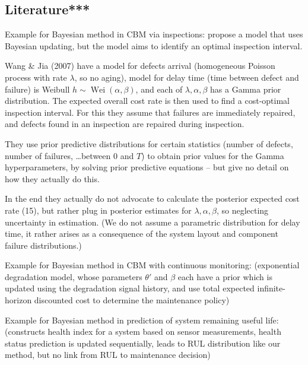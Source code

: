 \documentclass[authoryear]{elsarticle}
\newcommand{\wei}{\operatorname{Wei}} %
\begin{document}
\subsection{Literature***}

Example for Bayesian method in CBM via inspections: \cite{2007:wang-jia}
propose a model that uses Bayesian updating,
but the model aims to identify an optimal inspection interval.

\begin{scriptsize}
Wang \& Jia (2007) have a model for defects arrival (homogeneous Poisson process with rate $\lambda$, so no aging),
model for delay time (time between defect and failure) is Weibull $h \sim \wei(\alpha,\beta)$,
and each of $\lambda, \alpha, \beta$ has a Gamma prior distribution.
The expected overall cost rate is then used to find a cost-optimal inspection interval.
For this they assume that failures are immediately repaired,
and defects found in an inspection are repaired during inspection.

They use prior predictive distributions for certain statistics (number of defects, number of failures, \ldots between $0$ and $T$)
to obtain prior values for the Gamma hyperparameters,
by solving prior predictive equations -- but give no detail on how they actually do this.

In the end they actually do not advocate to calculate the posterior expected cost rate (15),
but rather plug in posterior estimates for $\lambda, \alpha, \beta$,
so neglecting uncertainty in estimation.
(We do not assume a parametric distribution for delay time,
it rather arises as a consequence of the system layout and component failure distributions.)

\end{scriptsize}

Example for Bayesian method in CBM with continuous monitoring: \cite{2011:elwany-et-al}
(exponential degradation model, whose parameters $\theta'$ and $\beta$ each have a prior
which is updated using the degradation signal history,
and use total expected infinite-horizon discounted cost to determine the maintenance policy)

Example for Bayesian method in prediction of system remaining useful life: \cite{2012:sun-et-al}
(constructs health index for a system based on sensor measurements,
health status prediction is updated sequentially,
leads to RUL distribution like our method,
but no link from RUL to maintenance decision)
\end{document}
